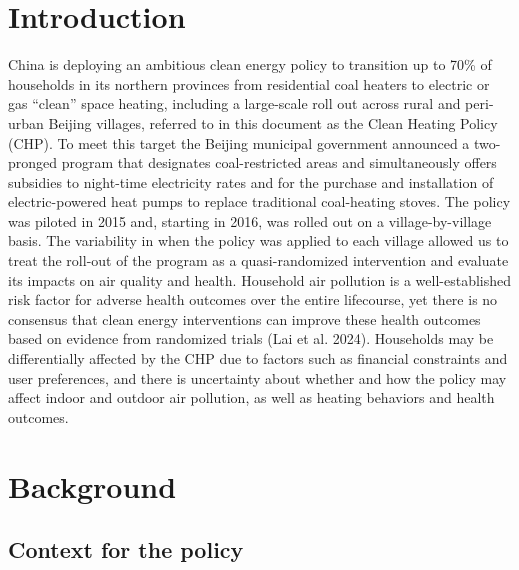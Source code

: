 \documentclass[
  letterpaper,
  DIV=11,
  numbers=noendperiod]{scrartcl}
\begin{document}
\newpage

\section{Introduction}\label{introduction-1}

China is deploying an ambitious clean energy policy to transition up to
70\% of households in its northern provinces from residential coal
heaters to electric or gas ``clean'' space heating, including a
large-scale roll out across rural and peri-urban Beijing villages,
referred to in this document as the Clean Heating Policy (CHP). To meet
this target the Beijing municipal government announced a two-pronged
program that designates coal-restricted areas and simultaneously offers
subsidies to night-time electricity rates and for the purchase and
installation of electric-powered heat pumps to replace traditional
coal-heating stoves. The policy was piloted in 2015 and, starting in
2016, was rolled out on a village-by-village basis. The variability in
when the policy was applied to each village allowed us to treat the
roll-out of the program as a quasi-randomized intervention and evaluate
its impacts on air quality and health. Household air pollution is a
well-established risk factor for adverse health outcomes over the entire
lifecourse, yet there is no consensus that clean energy interventions
can improve these health outcomes based on evidence from randomized
trials (Lai et al. 2024). Households may be differentially affected by
the CHP due to factors such as financial constraints and user
preferences, and there is uncertainty about whether and how the policy
may affect indoor and outdoor air pollution, as well as heating
behaviors and health outcomes.

\section{Background}\label{background}

\subsection{Context for the policy}\label{context-for-the-policy}
\end{document}

